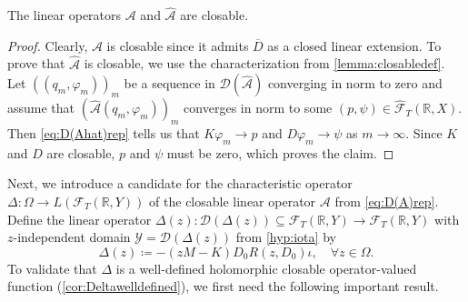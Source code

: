 \documentclass[english]{myarticle}
\begin{document}
\begin{sloppypar}
\begin{lemma} \label{lemma:D0closable}
    The linear operators $\mathcal{A}$ and $\hat{\mathcal{A}}$ are closable.
\end{lemma}
\begin{proof}
Clearly, $\mathcal{A}$ is closable since it admits $\overline{D}$ as a closed linear extension. To prove that $\hat{\mathcal{A}}$ is closable, we use the characterization from \cref{lemma:closabledef}. Let $((q_m,\varphi_m))_m$ be a sequence in $\mathcal{D}(\hat{\mathcal{A}})$ converging in norm to zero and assume that $(\hat{\mathcal{A}}(q_m,\varphi_m))_m$ converges in norm to some $(p,\psi) \in \hat{\mathcal{F}}_T(\mathbb{R},X)$. Then \eqref{eq:D(Ahat)rep} tells us that $K\varphi_m \to p$ and $D\varphi_m \to \psi$ as $m \to \infty$. Since $K$ and $D$ are closable, $p$ and $\psi$ must be zero, which proves the claim.
\end{proof}

Next, we introduce a candidate for the characteristic operator $\Delta : \Omega \to L(\mathcal{F}_T(\mathbb{R},Y))$ of the closable linear operator $\mathcal{A}$ from \eqref{eq:D(A)rep}. Define the linear operator $\Delta(z) : \mathcal{D}(\Delta(z)) \subseteq \mathcal{F}_T(\mathbb{R},Y) \to \mathcal{F}_T(\mathbb{R},Y)$ with $z$-independent domain $\mathcal{Y} = \mathcal{D}(\Delta(z))$ from \ref{hyp:iota} by
\begin{equation} \label{eq:Delta(z)1}
    \Delta(z) \coloneqq -(zM - K)D_0R(z,D_0) \iota, \quad \forall z \in \Omega.
\end{equation}
To validate that $\Delta$ is a well-defined holomorphic closable operator-valued function (\cref{cor:Deltawelldefined}), we first need the following important result.


\end{sloppypar}
\end{document}
